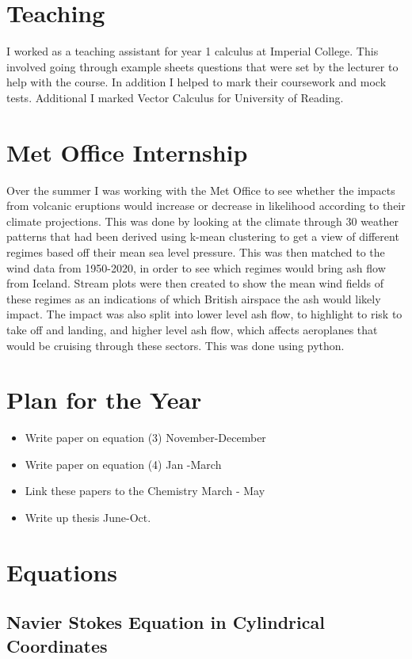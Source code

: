 \documentclass[12pt]{article}
\begin{document}
\section{Teaching}
I worked as a teaching assistant for year 1 calculus at Imperial College. This involved going through example sheets questions that were set by the lecturer to help with the course. In addition I helped to mark their coursework and mock tests. Additional I marked Vector Calculus for University of Reading.

\section{Met Office Internship}
Over the summer I was working with the Met Office to see whether the impacts from volcanic eruptions would increase or decrease in likelihood according to their climate projections. This was done by looking at the climate through 30 weather patterns that had been derived using k-mean clustering to get a view of different regimes based off their mean sea level pressure. This was then matched to the wind data from 1950-2020, in order to see which regimes would bring ash flow from Iceland. Stream plots were then created to show the mean wind fields of these regimes as an indications of which British airspace the ash would likely impact. The impact was also split into lower level ash flow, to highlight to risk to take off and landing, and higher level ash flow, which affects aeroplanes that would be cruising through these sectors. This was done using python.
\section{Plan for the Year}
\begin{itemize}
\item Write paper on equation (3) November-December
\item Write paper on equation (4) Jan -March
\item Link these papers to the Chemistry March - May
\item Write up thesis June-Oct.
\end{itemize}
\appendix
\section{Equations}
\subsection{Navier Stokes Equation in Cylindrical Coordinates \label{eqs}}
\end{document}
